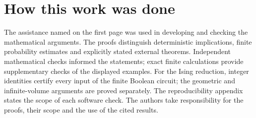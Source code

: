 \section*{How this work was done}
The assistance named on the first page was used in developing and checking the mathematical arguments. The proofs distinguish deterministic implications, finite probability estimates and explicitly stated external theorems. Independent mathematical checks informed the statements; exact finite calculations provide supplementary checks of the displayed examples. For the Ising reduction, integer identities certify every input of the finite Boolean circuit; the geometric and infinite-volume arguments are proved separately. The reproducibility appendix states the scope of each software check. The authors take responsibility for the proofs, their scope and the use of the cited results.

